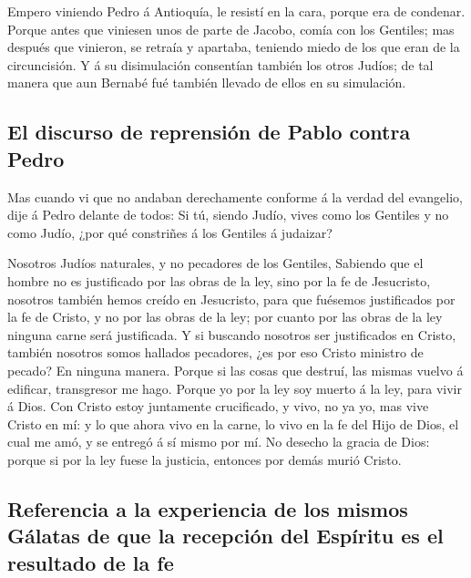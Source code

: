  Empero viniendo Pedro á Antioquía, le resistí en la
cara, porque era de condenar.  Porque antes que viniesen
unos de parte de Jacobo, comía con los Gentiles; mas después que
vinieron, se retraía y apartaba, teniendo miedo de los que eran de la
circuncisión.  Y á su disimulación consentían también los
otros Judíos; de tal manera que aun Bernabé fué también llevado de ellos
en su simulación.

\hypertarget{el-discurso-de-reprensiuxf3n-de-pablo-contra-pedro}{%
\subsection{El discurso de reprensión de Pablo contra
Pedro}\label{el-discurso-de-reprensiuxf3n-de-pablo-contra-pedro}}

 Mas cuando vi que no andaban derechamente conforme á la
verdad del evangelio, dije á Pedro delante de todos: Si tú, siendo
Judío, vives como los Gentiles y no como Judío, ¿por qué constriñes á
los Gentiles á judaizar?

 Nosotros Judíos naturales, y no pecadores de los
Gentiles,  Sabiendo que el hombre no es justificado por
las obras de la ley, sino por la fe de Jesucristo, nosotros también
hemos creído en Jesucristo, para que fuésemos justificados por la fe de
Cristo, y no por las obras de la ley; por cuanto por las obras de la ley
ninguna carne será justificada.  Y si buscando nosotros
ser justificados en Cristo, también nosotros somos hallados pecadores,
¿es por eso Cristo ministro de pecado? En ninguna manera.
 Porque si las cosas que destruí, las mismas vuelvo á
edificar, transgresor me hago.  Porque yo por la ley soy
muerto á la ley, para vivir á Dios.  Con Cristo estoy
juntamente crucificado, y vivo, no ya yo, mas vive Cristo en mí: y lo
que ahora vivo en la carne, lo vivo en la fe del Hijo de Dios, el cual
me amó, y se entregó á sí mismo por mí.  No desecho la
gracia de Dios: porque si por la ley fuese la justicia, entonces por
demás murió Cristo.

\hypertarget{referencia-a-la-experiencia-de-los-mismos-guxe1latas-de-que-la-recepciuxf3n-del-espuxedritu-es-el-resultado-de-la-fe}{%
\subsection{Referencia a la experiencia de los mismos Gálatas de que la
recepción del Espíritu es el resultado de la
fe}\label{referencia-a-la-experiencia-de-los-mismos-guxe1latas-de-que-la-recepciuxf3n-del-espuxedritu-es-el-resultado-de-la-fe}}

